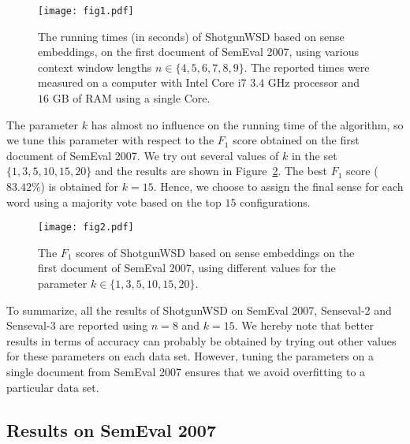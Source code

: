 \documentclass[11pt]{article}
\begin{document}
\begin{figure}
\begin{center}
\texttt{[image: fig1.pdf]}
\end{center}
\vspace*{-0.8em}
\caption{The running times (in seconds) of ShotgunWSD based on sense embeddings, on the first document of SemEval 2007, using various context window lengths $n \in \{4,5,6,7,8,9\}$. The reported times were measured on a computer with Intel Core i7 $3.4$ GHz processor and $16$ GB of RAM using a single Core.}
\label{fig_tuning_n}
\vspace*{-0.4em}
\end{figure}

The parameter $k$ has almost no influence on the running time of the algorithm, so we tune this parameter with respect to the $F_1$ score obtained on the first document of SemEval 2007. We try out several values of $k$ in the set $\{1,3,5,10,15,20 \}$ and the results are shown in Figure~\ref{fig_tuning_k}. The best $F_1$ score ($83.42\%$) is obtained for $k = 15$. Hence, we choose to assign the final sense for each word using a majority vote based on the top $15$ configurations. 

\begin{figure}
\begin{center}
\texttt{[image: fig2.pdf]}
\end{center}
\vspace*{-0.8em}
\caption{The $F_1$ scores of ShotgunWSD based on sense embeddings on the first document of SemEval 2007, using different values for the parameter $k \in \{1,3,5,10,15,20 \}$.}
\vspace*{-0.4em}
\label{fig_tuning_k}
\end{figure}

To summarize, all the results of ShotgunWSD on SemEval 2007, Senseval-2 and Senseval-3 are reported using $n = 8$ and $k = 15$. We hereby note that better results in terms of accuracy can probably be obtained by trying out other values for these parameters on each data set. However, tuning the parameters on a single document from SemEval 2007 ensures that we avoid overfitting to a particular data set.

\subsection{Results on SemEval 2007}
\end{document}
